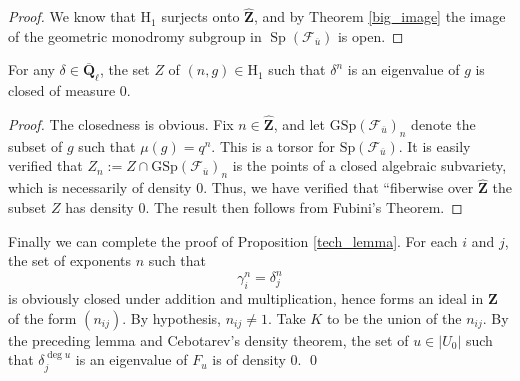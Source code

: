 \documentclass[letterpaper,11pt]{article}
\newcommand{\Q}{\mathbf{Q}}
\newcommand{\Z}{\mathbf{Z}}
\newcommand{\ol}[1]{\overline{#1}}
\newcommand{\wh}[1]{\widehat{#1}}
\newcommand{\Cal}[1]{\mathcal{#1}}
\newcommand{\mrm}[1]{\mathrm{#1}}
\DeclareMathOperator{\Sp}{Sp}
\begin{document}
\begin{proof}
We know that $\mrm{H}_1$ surjects onto $\wh{\Z}$, and by Theorem \ref{big_image} the image of the geometric monodromy subgroup in $\Sp(\Cal{F}_{\ol{u}})$ is open. 
\end{proof}

\begin{lemma}
For any $\delta \in \ol{\Q}_{\ell}$, the set $Z$ of $(n,g) \in \mrm{H}_1$ such that $\delta^n$ is an eigenvalue of $g$ is closed of measure $0$. 
\end{lemma}

\begin{proof}
The closedness is obvious. Fix $n \in \wh{\Z}$, and let $\mrm{GSp}(\Cal{F}_{\ol{u}})_n$ denote the subset of $g$ such that $\mu(g) = q^n$. This is a torsor for $\mrm{Sp}(\Cal{F}_{\ol{u}})$. It is easily verified that $Z_n := Z \cap \mrm{GSp}(\Cal{F}_{\ol{u}})_n$ is the points of a closed algebraic subvariety, which is necessarily of density $0$. Thus, we have verified that ``fiberwise over $\wh{\Z}$ the subset $Z$ has density $0$. The result then follows from Fubini's Theorem. 
\end{proof}


Finally we can complete the proof of Proposition \ref{tech_lemma}. For each $i$ and $j$, the set of exponents $n$ such that 
\[
\gamma_i^n = \delta_j^n
\]
is obviously closed under addition and multiplication, hence forms an ideal in $\Z$ of the form $(n_{ij})$. By hypothesis, $n_{ij} \neq 1$. Take $K$ to be the union of the $n_{ij}$. By the preceding lemma and Cebotarev's density theorem, the set of $u\in |U_0|$ such that $\delta_j^{\deg u}$ is an eigenvalue of $F_u$ is of density $0$. \qed





\renewcommand{\refname}{References}



\end{document}
